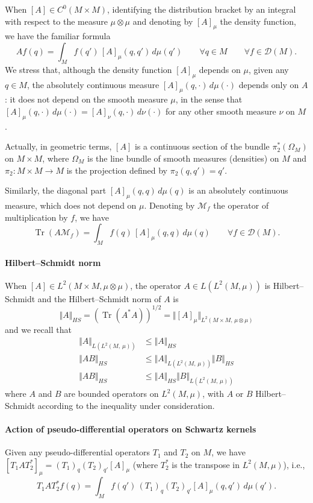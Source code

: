 \documentclass[AHL,Unicode,published]{cedram}
\newcommand{\calD}{\mathcal{D}}
\newcommand{\calM}{\mathcal{M}}
\DeclareMathOperator{\Tr}{Tr}
\renewcommand{\leq}{\leqslant}
\let\oldforall\forall
\renewcommand*{\forall}{\mathrel{\oldforall}}
\begin{document}
When $[A]\in C^0(M\times M)$, identifying the distribution bracket by an integral with respect to the measure $\mu\otimes\mu$ and denoting by $[A]_\mu$ the density function, we have the familiar formula
\[
Af(q) = \int_M f(q') \, [A]_\mu(q,q') \, d\mu(q') \qquad \forall q\in M\qquad \forall f\in\calD(M).
\]
We stress that, although the density function $[A]_\mu$ depends on $\mu$, given any $q\in M$, the absolutely continuous measure $[A]_\mu(q,\cdot)\, d\mu(\cdot)$ depends only on $A$: it does not depend on the smooth measure $\mu$, in the sense that $[A]_\mu(q,\cdot)\, d\mu(\cdot) = [A]_\nu(q,\cdot)\, d\nu(\cdot)$ for any other smooth measure $\nu$ on $M$.

Actually, in geometric terms, $[A]$ is a continuous section of the bundle $\pi_2^*(\Omega_M)$ on $M\times M$, where $\Omega_M$ is the line bundle of smooth measures (densities) on $M$ and $\pi_2:M\times M\rightarrow M$ is the projection defined by $\pi_2(q,q')=q'$.

Similarly, the diagonal part $[A]_\mu(q,q)\, d\mu(q)$ is an absolutely continuous measure, which does not depend on $\mu$. Denoting by $\calM_f$ the operator of multiplication by $f$, we have
\[
\Tr(A \calM_f) = \int_M f(q)\, [A]_\mu(q,q) \, d\mu(q) \qquad\forall f\in \calD(M).
\]

\goodbreak
\paragraph{Hilbert--Schmidt norm}
When $[A]\in L^2(M\times M,\mu\otimes\mu)$, the operator $A\in L(L^2(M,\mu))$ is Hilbert--Schmidt and the Hilbert--Schmidt norm of $A$ is
\[
\Vert A\Vert_{HS} = (\Tr(A^*A))^{1/2} = \Vert [A]_\mu\Vert_{L^2\left(M\times M,\,\mu\otimes\mu\right)}
\]
and we recall that
\begin{align*}
\Vert A\Vert_{L(L^2(M,\,\mu))} &\leq \Vert A\Vert_{HS} \\
\Vert AB\Vert_{HS} &\leq \Vert A\Vert_{L(L^2(M,\,\mu))} \Vert B\Vert_{HS} \\
\Vert AB\Vert_{HS} &\leq \Vert A\Vert_{HS} \Vert B\Vert_{L(L^2(M,\,\mu))}
\end{align*}
where $A$ and $B$ are bounded operators on $L^2(M,\mu)$, with $A$ or $B$ Hilbert--Schmidt according to the inequality under consideration.

\goodbreak
\paragraph{Action of pseudo-differential operators on Schwartz kernels}
Given any pseudo-differential operators $T_1$ and $T_2$ on $M$, we have $[T_1AT_2^*]_\mu = (T_1)_q (T_2)_{q'}[A]_\mu$ (where $T_2^*$ is the transpose in $L^2(M,\mu)$), i.e.,
\[
T_1AT_2^* f(q) = \int_M f(q')\, (T_1)_q (T_2)_{q'}[A]_\mu (q,q') \, d\mu(q').
\]
\end{document}
